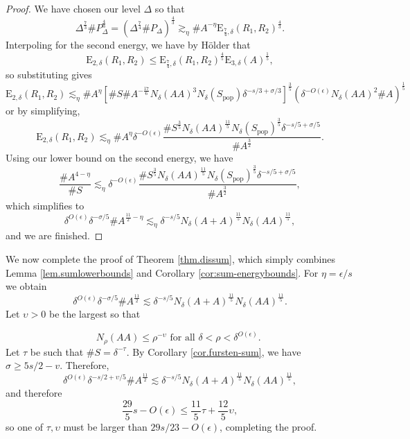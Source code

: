 \documentclass[12pt]{amsart}
\newcommand{\1}{\mathbf{1}}
\newcommand{\e}{\epsilon}
\begin{document}
\begin{proof}
We have chosen our level \(\Delta\) so that
\[
	\Delta^{\frac{7}{3} } \# P_{\Delta} ^{\frac{4}{3} }= \left( \Delta^{\frac{7}{4} } \# P_{\Delta} \right) ^{\frac{4}{3} } \gtrsim _{\eta} \# A ^{- \eta} \mathrm{E} _{\frac{7}{4} ,\delta} (R_1,R_2)^{\frac{4}{3} }   
.\]
Interpoling for the second energy, we have by H\"older that
\[
	\mathrm{E} _{2,\delta}  (R_1,R_2) \leq \mathrm{E} _{\frac{7}{4} ,\delta} (R_1,R_2)^{\frac{4}{5} } \mathrm{E} _{3,\delta} (A)^{\frac{1}{5} }
,\]
so substituting gives
\[
	\mathrm{E} _{2,\delta}  (R_1,R_2) \lesssim_{\eta}  \# A ^{\eta} \left[  \# S\# A ^{- \frac{17}{6} }  N_{\delta} (AA)^{3} N_{\delta} (S_{\text{pop}} )   \delta^{ - s / 3 + \sigma / 3   } \right] ^{\frac{3}{5}  } \left( \delta^{-O(\epsilon)} N_\delta(A A)^2 \# A \right) ^{\frac{1}{5} }
\]
or by simplifying,
\[
	\mathrm{E} _{2,\delta}  (R_1,R_2) \lesssim_{\eta} \# A^{\eta} \delta^{- O(\epsilon)} \frac{\# S ^{\frac{3}{5} } N_{\delta} (AA) ^{\frac{11}{5} } N_{\delta} (S_{\text{pop}} )^{\frac{3}{5} } \delta ^{- s /5 + \sigma /5}}{\# A ^{\frac{3}{2} }} 
.\]
Using our lower bound on the second energy, we have
\[
	\frac{\# A ^{4 - \eta}}{\# S} \lesssim_{\eta}  \delta^{-O(\epsilon)} \frac{\# S ^{\frac{3}{5} } N_{\delta} (AA) ^{\frac{11}{5} } N_{\delta} (S_{\text{pop}} )^{\frac{3}{5} } \delta ^{- s /5 + \sigma /5}}{\# A ^{\frac{3}{2} }} 
,\]
which simplifies to 
\[
	\delta^{O(\epsilon)} \delta^{- \sigma / 5    } \# A ^{\frac{11}{2} - \eta }\lesssim_{\eta}  \delta^{- s /5} N_{\delta} (A+A) ^{\frac{11}{5} } N_{\delta} (AA)^{\frac{11}{5} }
,\]
and we are finished.
\end{proof}
	

We now complete the proof of Theorem \ref{thm.dissum}, which simply combines Lemma \ref{lem.sumlowerbounds} and Corollary \ref{cor:sum-energybounds}. For $\eta = \e/s$ we obtain
\[
    \delta^{O(\epsilon)} \delta^{- \sigma / 5    } \# A ^{\frac{11}{2}  }\lesssim \delta^{- s /5} N_{\delta} (A+A) ^{\frac{11}{5} } N_{\delta} (AA)^{\frac{11}{5} }
.\]
Let \(\upsilon>0\) be the largest so that

\[
N_\rho(A A) \leq \rho ^{- \upsilon} \text { for all } \delta<\rho<\delta^{O(\epsilon)} \text {. }
\]
Let \(\tau\) be such that \(\# S=\delta^{-\tau}\). By Corollary \ref{cor.fursten-sum}, we have \(\sigma \geq 5 s / 2-v\). Therefore,
\[
    \delta^{O(\epsilon)} \delta ^{- s / 2 + \upsilon / 5}\# A ^{\frac{11}{2} }\lesssim \delta^{- s / 5} N_{\delta} (A+A)^{\frac{11}{5} } N_{\delta} (AA)^{\frac{11}{5} }
,\]
and therefore
\[
    \frac{29}{5} s - O(\epsilon) \leq \frac{11}{5} \tau + \frac{12}{5} \upsilon
,\]
so one of \(\tau,\upsilon\) must be larger than \(29 s / 23 - O(\epsilon)\), completing the proof.



\end{document}
